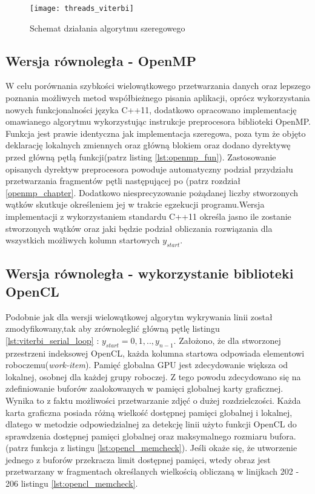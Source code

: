 \documentclass[document.tex]{subfiles}
\begin{document}
\begin{figure}[h]
\texttt{[image: threads\_viterbi]}
\caption{Schemat działania algorytmu szeregowego}
\label{fig:threads_viterbi}
\end{figure}
\clearpage
\subsection{Wersja równoległa - OpenMP}
\indent W celu porównania szybkości wielowątkowego przetwarzania danych oraz lepszego poznania
możliwych metod współbieżnego pisania aplikacji, oprócz wykorzystania nowych funkcjonalności języka C++11,
dodatkowo opracowano implementację omawianego algorytmu wykorzystując instrukcje preprocesora biblioteki 
OpenMP. Funkcja jest prawie identyczna jak implementacja szeregowa, poza tym że objęto deklarację lokalnych zmiennych oraz główną blokiem  oraz dodano dyrektywę  przed główną pętlą funkcji(patrz listing \ref{lst:openmp_fun}). Zastosowanie opisanych dyrektyw preprocesora powoduje automatyczny
podział przydziału przetwarzania fragmentów pętli następującej po (patrz rozdział \ref{openmp_chapter}. Dodatkowo niesprecyzowanie pożądanej liczby stworzonych wątków skutkuje określeniem jej
w trakcie egzekucji programu.\cite{openmp_guide}Wersja implementacji z wykorzystaniem standardu C++11 określa jasno ile zostanie stworzonych wątków oraz jaki będzie podział obliczania rozwiązania dla wszystkich możliwych kolumn startowych $y_{start}$.

 


\clearpage
\subsection{Wersja równoległa - wykorzystanie biblioteki OpenCL}
\indent Podobnie jak dla wersji wielowątkowej algorytm wykrywania linii został zmodyfikowany,tak aby 
zrównoleglić główną pętlę listingu \ref{lst:viterbi_serial_loop} : $y_{start} = 0,1,.., y_{n-1}$.
Założono, że dla stworzonej przestrzeni indeksowej OpenCL, każda kolumna startowa odpowiada elementowi roboczemu(\textit{work-item}). 
\indent Pamięć globalna GPU jest zdecydowanie większa od lokalnej, osobnej dla każdej grupy roboczej.
Z tego powodu zdecydowano się na zdefiniowanie buforów zaalokowanych w pamięci globalnej karty graficznej.
Wynika to z faktu możliwości przetwarzanie zdjęć o dużej rozdzielczości. Każda karta graficzna posiada różną wielkość dostępnej pamięci globalnej i lokalnej, dlatego w metodzie  odpowiedzialnej za detekcję linii użyto funkcji OpenCL do sprawdzenia dostępnej pamięci globalnej oraz maksymalnego rozmiaru bufora.(patrz funkcja  z listingu \ref{lst:opencl_memcheck}). Jeśli okaże się, że
utworzenie jednego z buforów przekracza limit dostępnej pamięci, wtedy obraz jest przetwarzany w fragmentach
określanych wielkością  obliczaną w linijkach 202 - 206 listingu \ref{lst:opencl_memcheck}.
\end{document}
